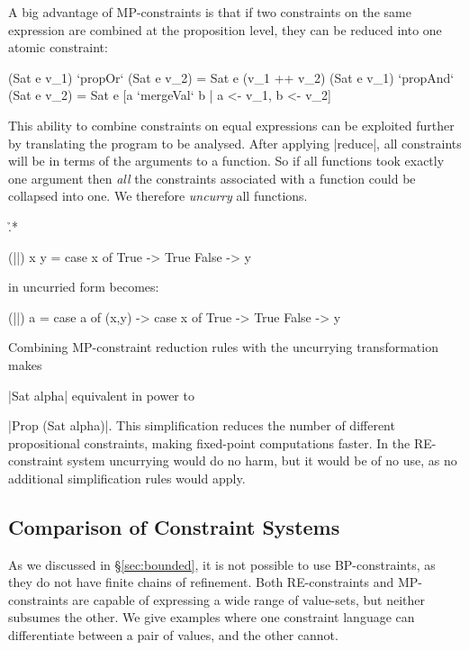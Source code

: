 \documentclass[preprint]{sigplanconf}
\begin{document}
A big advantage of MP-constraints is that if two constraints on the same expression are combined at the proposition level, they can be reduced into one atomic constraint:

\ignore\begin{code}
(Sat e v_1)  `propOr`   (Sat e v_2) = Sat e (v_1 ++ v_2)
(Sat e v_1)  `propAnd`  (Sat e v_2) = Sat e [a `mergeVal` b | a <- v_1, b <- v_2]
\end{code}

\noindent This ability to combine constraints on equal expressions can be exploited further by translating the program to be analysed. After applying |reduce|, all constraints will be in terms of the arguments to a function. So if all functions took exactly one argument then \textit{all} the constraints associated with a function could be collapsed into one. We therefore \textit{uncurry} all functions.

\begin{example}
\h{.*}\begin{code}
(||) x y = case  x of
                 True   -> True
                 False  -> y
\end{code}

\noindent in uncurried form becomes:

\begin{onepage}
\ignore\begin{code}
(||) a = case  a of
               (x,y) -> case  x of
                              True    -> True
                              False   -> y
\end{code}
\end{onepage}
\end{example}

Combining MP-constraint reduction rules with the uncurrying transformation makes \ignore|Sat alpha| equivalent in power to \ignore|Prop (Sat alpha)|. This simplification reduces the number of different propositional constraints, making fixed-point computations faster. In the RE-constraint system uncurrying would do no harm, but it would be of no use, as no additional simplification rules would apply.

\subsection{Comparison of Constraint Systems}

As we discussed in \S\ref{sec:bounded}, it is not possible to use BP-constraints, as they do not have finite chains of refinement. Both RE-constraints and MP-constraints are capable of expressing a wide range of value-sets, but neither subsumes the other. We give examples where one constraint language can differentiate between a pair of values, and the other cannot.
\end{document}
